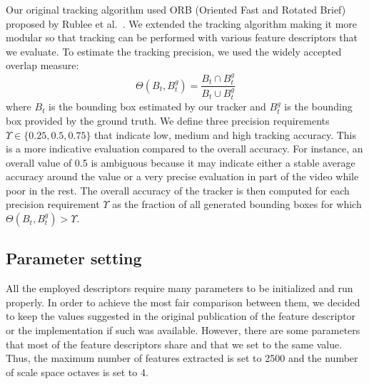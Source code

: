 Our original tracking algorithm used ORB (Oriented Fast and Rotated Brief) proposed by Rublee et al.~\cite{rublee11}. 
We extended the tracking algorithm making it more modular so that tracking can be performed with 
various feature descriptors that we evaluate. To estimate the tracking precision, we used the widely accepted overlap measure:
\begin{equation}
	\Theta (B_{t}, B^g_t) = \frac{B_{t} \cap B^g_t}{B_{t} \cup B^g_t}
\end{equation}
where \textit{$B_{t}$} is the bounding box estimated by our tracker and
\textit{$B^g_t$} is the bounding box provided by the ground truth. We define 
three precision requirements $\Upsilon \in \{0.25, 0.5, 0.75\}$ that indicate low, medium and high tracking accuracy. This is a more indicative evaluation compared to the overall accuracy. For instance, an overall value of 0.5 is ambiguous because it may indicate either a stable average accuracy around the value or a very precise evaluation in part of the video while poor in the rest.
%
%
%
%
%
The overall accuracy of the tracker is then computed for each precision requirement $\Upsilon$ as the fraction of all generated bounding boxes for which $\Theta(B_{t}, B^g_t) > \Upsilon$.



\subsection{Parameter setting}

All the employed descriptors require many parameters to be initialized and run properly. In order to achieve the most fair comparison between them, we decided to keep the values suggested in the original publication of the feature descriptor or the implementation if such was available. However, there are some parameters that most of the feature descriptors share and that we set to the same value. Thus, the maximum number of features extracted is set to 2500 and the number of scale space octaves is set to 4.



